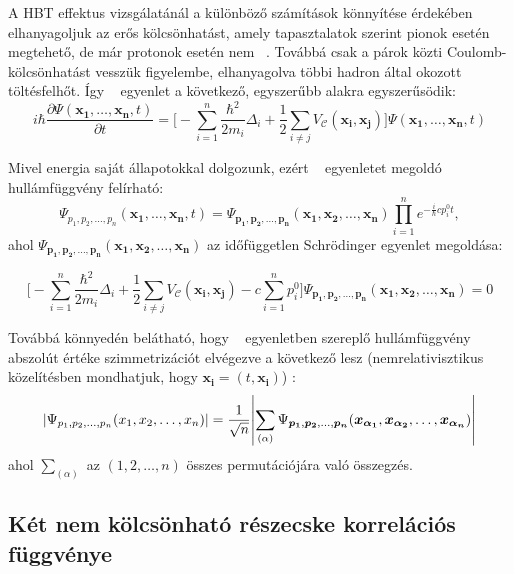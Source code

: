 \documentclass[11pt,a4paper]{article}
\numberwithin{equation}{subsection}
\numberwithin{figure}{section}
\begin{document}
A HBT effektus vizsgálatánál a különböző számítások könnyítése érdekében elhanyagoljuk az erős kölcsönhatást, amely tapasztalatok szerint pionok esetén megtehető, de már protonok esetén nem ~\cite{Pratt:1990zq}. Továbbá csak a párok közti Coulomb-kölcsönhatást vesszük figyelembe, elhanyagolva többi hadron által okozott töltésfelhőt. Így ~ egyenlet a következő, egyszerűbb alakra egyszerűsödik:
\begin{equation}
i\hbar\frac{\partial \Psi(\bm{x_1},\dots, \bm{x_n},t )}{\partial t} = \Bigg[-\sum_{i=1}^{n}\frac{\hbar^2}{2m_i}\Delta_i + \frac{1}{2}\sum_{i\neq j} V_\mathcal{C}(\bm{x_i},\bm{x_j})\Bigg]\Psi(\bm{x_1},\dots, \bm{x_n} ,t)
\label{eq:Sch}
\end{equation}

Mivel energia saját állapotokkal dolgozunk, ezért  ~ egyenletet megoldó hullámfüggvény felírható:
\begin{equation}
\Psi_{p_1, {p_2}, \dots, {p_n}}(\bm{x_1},\dots, \bm{x_n},t )  
= \Psi_{\bm{p_1}, \bm{p_2}, \dots, \bm{p_n}}(\bm{x_1}, \bm{x_2}, \dots, \bm{x_n})\prod_{i=1}^ne^{-\frac{i}{\hbar}cp_i^0t},
\end{equation}
ahol $\Psi_{\bm{p_1}, \bm{p_2}, \dots, \bm{p_n}}(\bm{x_1}, \bm{x_2}, \dots, \bm{x_n})$ az időfüggetlen Schrödinger egyenlet megoldása:

\begin{equation}
\Bigg[-\sum_{i=1}^{n}\frac{\hbar^2}{2m_i}\Delta_i + \frac{1}{2}\sum_{i\neq j} V_\mathcal{C}(\bm{x_i},\bm{x_j})  
 - c\sum_{i=1}^n p_i^0
 \Bigg]\Psi_{\bm{p_1}, \bm{p_2}, \dots, \bm{p_n}}(\bm{x_1}, \bm{x_2}, \dots, \bm{x_n}) = 0
\end{equation}

Továbbá könnyedén belátható, hogy ~ egyenletben szereplő hullámfüggvény abszolút értéke szimmetrizációt elvégezve a következő lesz  (nemrelativisztikus közelítésben mondhatjuk, hogy $\bm{x_i} = (t,\bm{x_i})$) :
\begin{equation}
\abs{\Psi_{{p_1},{p_2}, \dots,{p_n}}({x_1}, {x_2}, \dots, {x_n})} = \frac{1}{\sqrt{n}}\abs{\sum_{(\alpha)}\Psi_{\bm{p_1}, \bm{p_2}, \dots, \bm{p_n}}(\bm{x_{\alpha_1}}, \bm{x_{\alpha_2}}, \dots, \bm{x_{\alpha_n}})}
\label{eq:Psin}
\end{equation}
ahol $\sum_{(\alpha)}$ az $(1,2,\dots,n)$ összes permutációjára való összegzés.


\subsection{Két nem kölcsönható részecske korrelációs függvénye}\label{sec:C20}
\end{document}
